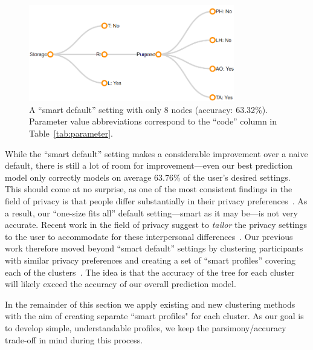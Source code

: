 \begin{figure}
	\centering
	\includegraphics[width=0.8\textwidth]{figures/smartdefault001.png}
	\caption{A ``smart default'' setting with only 8 nodes (accuracy: 63.32\%). Parameter value abbreviations correspond to the ``code'' column in Table~\ref{tab:parameter}.}
	\label{fig:smart_default_new}
\end{figure}


While the ``smart default'' setting makes a considerable improvement over a naive default, there is still a lot of room for improvement---even our best prediction model only correctly models on average 63.76\% of the user's desired settings. This should come at no surprise, as one of the most consistent findings in the field of privacy is that people differ substantially in their privacy preferences~\cite{knijnenburg2013dimensionality}. As a result, our ``one-size fits all'' default setting---smart as it may be---is not very accurate. Recent work in the field of privacy suggest to \emph{tailor} the privacy settings to the user to accommodate for these interpersonal differences~\cite{knijnenburg2017}. Our previous work therefore moved beyond ``smart default'' settings by clustering participants with similar privacy preferences and creating a set of ``smart profiles'' covering each of the clusters~\cite{bahiratiui2018}. The idea is that the accuracy of the tree for each cluster will likely exceed the accuracy of our overall prediction model. 

In the remainder of this section we apply existing and new clustering methods with the aim of creating separate ``smart profiles" for each cluster. As our goal is to develop simple, understandable profiles, we keep the parsimony/accuracy trade-off in mind during this process.


